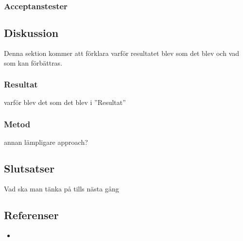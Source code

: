 	\subsubsection{Acceptanstester}
	
	
	\subsection{Diskussion}
	Denna sektion kommer att förklara varför resultatet blev som det blev och vad som kan förbättras.	
	
	\subsubsection{Resultat}
	varför blev det som det blev i ''Resultat''
	
	\subsubsection{Metod}
	annan lämpligare approach?	
	
	\subsection{Slutsatser}
	Vad ska man tänka på tills nästa gång
	
	\subsection{Referenser}
	\begin{itemize}
	\item{}
	\end{itemize}

